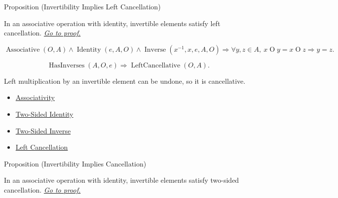 \begin{propositionbox}{Proposition (Invertibility Implies Left Cancellation)}
\begin{proposition}
\label{prop:invertibility-implies-left-cancellation}
In an associative operation with identity, invertible elements satisfy left
cancellation.
\hyperref[prf:invertibility-implies-left-cancellation]{\textit{Go to proof.}}
\end{proposition}
\end{propositionbox}

\begin{remark*}
\[
\operatorname{Associative}(O,A)
\land
\operatorname{Identity}(e,A,O)
\land
\operatorname{Inverse}(x^{-1},x,e,A,O)
\Longrightarrow
\forall y,z\in A,\ x\mathbin{O}y=x\mathbin{O}z \Rightarrow y=z.
\]
\end{remark*}

\begin{remark*}
\[
\operatorname{HasInverses}(A,O,e)
\Longrightarrow
\operatorname{LeftCancellative}(O,A).
\]
\end{remark*}

\begin{remark*}[Interpretation]
Left multiplication by an invertible element can be undone, so it is
cancellative.
\end{remark*}

\begin{dependencies}
\begin{itemize}
  \item \hyperref[def:associativity]{Associativity}
  \item \hyperref[def:two-sided-identity]{Two-Sided Identity}
  \item \hyperref[def:two-sided-inverse]{Two-Sided Inverse}
  \item \hyperref[def:left-cancellation]{Left Cancellation}
\end{itemize}
\end{dependencies}

\begin{propositionbox}{Proposition (Invertibility Implies Cancellation)}
\begin{proposition}
\label{prop:invertibility-implies-cancellation}
In an associative operation with identity, invertible elements satisfy
two-sided cancellation.
\hyperref[prf:invertibility-implies-cancellation]{\textit{Go to proof.}}
\end{proposition}
\end{propositionbox}

